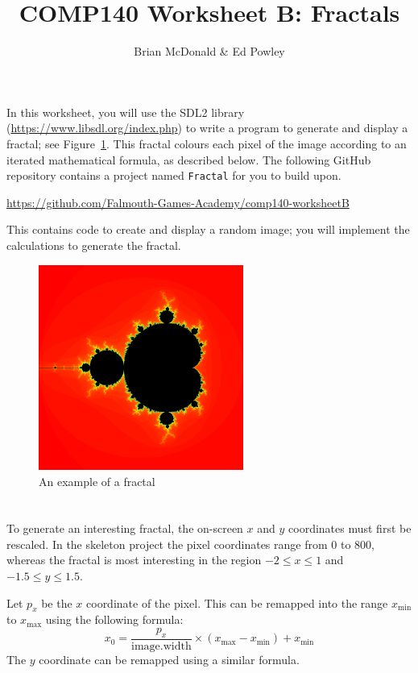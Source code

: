 \documentclass{../../../../fal_assignment}
\title{COMP140 Worksheet B: Fractals}
\author{Brian McDonald \& Ed Powley}
\begin{document}
\maketitle

In this worksheet, you will use the SDL2 library (\url{https://www.libsdl.org/index.php}) to write a program to generate and display a fractal; see Figure~\ref{fig:mandelbrot}.
This fractal colours each pixel of the image according to an iterated mathematical formula, as described below.
The following GitHub repository contains a project named \texttt{Fractal} for you to build upon.

\url{https://github.com/Falmouth-Games-Academy/comp140-worksheetB}

This contains code to create and display a random image; you will implement the calculations to generate the fractal.

\begin{figure}[!h]
	\begin{center}
		\includegraphics[width=0.6\textwidth]{mandelbrot.png}
	\end{center}
	\caption{An example of a fractal}
	\label{fig:mandelbrot}
\end{figure}

\section{} \label{core-c-first}

To generate an interesting fractal, the on-screen $x$ and $y$ coordinates must first be rescaled.
In the skeleton project the pixel coordinates range from $0$ to $800$,
whereas the fractal is most interesting in the region $-2 \leq x \leq 1$ and $-1.5 \leq y \leq 1.5$.

Let $p_x$ be the $x$ coordinate of the pixel. This can be remapped into the range $x_{\text{min}}$ to $x_{\text{max}}$ using the following formula:
\begin{equation*}
x_0 = \frac{p_x}{\text{image.width}} \times \left( x_{\text{max}} - x_{\text{min}} \right) + x_{\text{min}}
\end{equation*}
The $y$ coordinate can be remapped using a similar formula.
\end{document}
